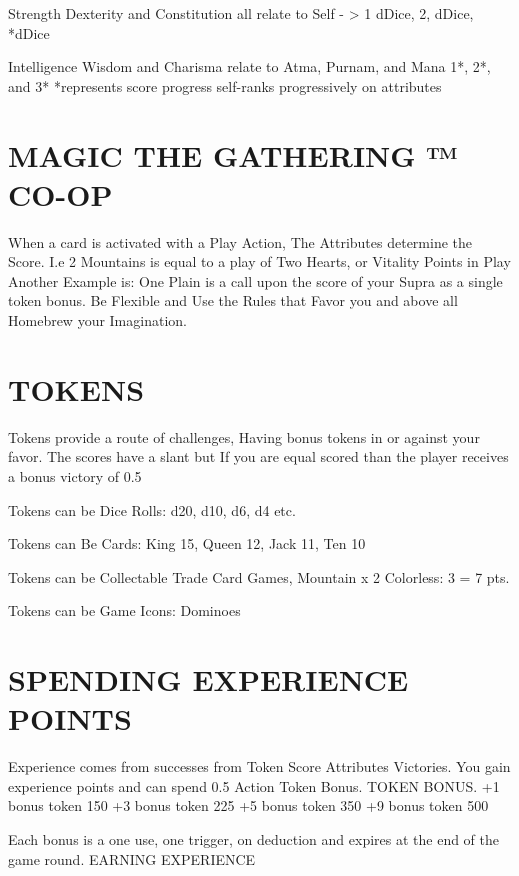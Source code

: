 \documentclass{article}
\begin{document}
Strength Dexterity and Constitution all relate to Self - > 1 dDice, 2, dDice, *dDice

Intelligence Wisdom and Charisma relate to Atma, Purnam, and Mana 1*, 2*, and 3*
*represents score progress self-ranks progressively on attributes

\section{MAGIC THE GATHERING ™ CO-OP}

	When a card is activated with a Play Action, The Attributes determine the Score.
I.e 2 Mountains is equal to a play of Two Hearts, or Vitality Points in Play
Another Example is: One Plain is a call upon the score of your Supra as a single token bonus.
Be Flexible and Use the Rules that Favor you and above all Homebrew your Imagination.

\section{TOKENS}

Tokens provide a route of challenges, Having bonus tokens in or against your favor.
The scores have a slant but If you are equal scored than the player receives a bonus victory of 0.5


Tokens can be Dice Rolls: d20, d10, d6, d4 etc.

Tokens can Be Cards: King 15, Queen 12, Jack 11, Ten 10

Tokens can be Collectable Trade Card Games, Mountain x 2 Colorless: 3 = 7 pts.

Tokens can be Game Icons: Dominoes

\section{SPENDING EXPERIENCE POINTS}

	Experience comes from successes from Token Score Attributes Victories.
You gain experience points and can spend 0.5%
Action Token Bonus.
TOKEN BONUS.
+1 bonus token 150%
+3 bonus token 225%
+5 bonus token 350%
+9 bonus token 500%

Each bonus is a one use, one trigger, on deduction and expires at the end of the game round.
EARNING EXPERIENCE
\end{document}
